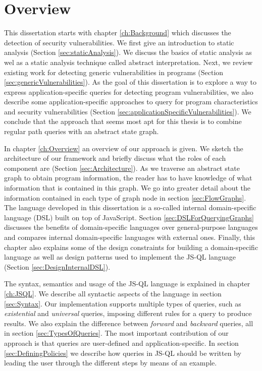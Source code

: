 \section{Overview}

This dissertation starts with chapter \ref{ch:Background} which discusses the detection of security vulnerabilities. We first give an introduction to static analysis (Section \ref{sec:staticAnalysis}). We discuss the basics of static analysis as wel as a static analysis technique called abstract interpretation. Next, we review existing work for detecting generic vulnerabilities in programs (Section \ref{sec:genericVulnerabilities}). As the goal of this dissertation is to explore a way to express application-specific queries for detecting program vulnerabilities, we also describe some application-specific approaches to query for program characteristics and security vulnerabilities (Section \ref{sec:applicationSpecificVulnerabilities}). We conclude that the approach that seems most apt for this thesis is to combine regular path queries with an abstract state graph.

In chapter \ref{ch:Overview} an overview of our approach is given. We sketch the architecture of our framework and briefly discuss what the roles of each component are (Section \ref{sec:Architecture}). As we traverse an abstract state graph to obtain program information, the reader has to have knowledge of what information that is contained in this graph. We go into greater detail about the information contained in each type of graph node in section \ref{sec:FlowGraphs}. The language developed in this dissertation is a so-called internal domain-specific language (DSL) built on top of JavaScript. Section  \ref{sec:DSLForQueryingGraphs} discusses the benefits of domain-specific languages over general-purpose languages and compares internal domain-specific languages with external ones. Finally, this chapter also explains some of the design constraints for building a domain-specific language as well as design patterns used to implement the JS-QL language (Section \ref{sec:DesignInternalDSL}).

The syntax, semantics and usage of the JS-QL language is explained in chapter \ref{ch:JSQL}. We describe all syntactic aspects of the language in section \ref{sec:Syntax}. Our implementation supports multiple types of queries, such as \textit{existential} and \textit{universal} queries, imposing different rules for a query to produce results. We also explain the difference between \textit{forward} and \textit{backward} queries, all in section \ref{sec:TypesOfQueries}. The most important contribution of our approach is that queries are user-defined and application-specific. In section \ref{sec:DefiningPolicies} we describe how queries in JS-QL should be written by leading the user through the different steps by means of an example.

